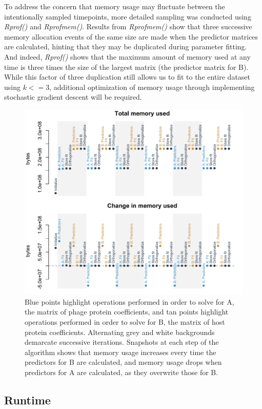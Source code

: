 \documentclass[12pt,twoside]{mitthesis-manusdown}
\begin{document}
To address the concern that memory usage may fluctuate between the
intentionally sampled timepoints, more detailed sampling was conducted
using \emph{Rprof()} and \emph{Rprofmem()}. Results from
\emph{Rprofmem()} show that three successive memory allocation events of
the same size are made when the predictor matrices are calculated,
hinting that they may be duplicated during parameter fitting. And
indeed, \emph{Rprof()} shows that the maximum amount of memory used at
any time is three times the size of the largest matrix (the predictor
matrix for B). While this factor of three duplication still allows us to
fit to the entire dataset using \(k<=3\), additional optimization of
memory usage through implementing stochastic gradient descent will be
required.
\begin{figure}[tb!]

{\centering \includegraphics[width=0.8\linewidth]{figurespred/figMemoryPointStore} 

}

\caption{\label{fig:figMemoryPointStore}Blue points highlight operations performed in order to solve for A, the matrix of phage protein coefficients, and tan points highlight operations performed in order to solve for B, the matrix of host protein coefficients. Alternating grey and white backgrounds demarcate successive iterations. Snapshots at each step of the algorithm shows that memory usage increases every time the predictors for B are calculated, and memory usage drops when predictors for A are calculated, as they overwrite those for B.}\label{fig:figMemoryPointStore}
\end{figure}
\subsection{Runtime}\label{runtime}
\end{document}
